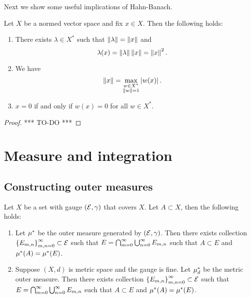 \documentclass[a4paper]{article}
\begin{document}
Next we show some useful implications of Hahn-Banach.

\begin{thm}
Let $X$ be a normed vector space and fix $x \in X$. Then 
the following holds: 
\begin{enumerate}
  \item There exists $\lambda \in X^*$ such that 
  $\left\lVert \lambda\right\rVert = \left\lVert x\right\rVert$ and 
  \[
  \lambda(x) = \left\lVert \lambda\right\rVert \left\lVert x\right\rVert = \left\lVert x\right\rVert^2.
  \]
  \item We have 
  \[
  \left\lVert x\right\rVert = \max_{\substack{w \in X^* \\ \left\lVert w\right\rVert = 1}} 
  \left\lvert w(x)\right\rvert.
  \]
  \item $x = 0$ if and only if $w(x) = 0$ for all $w \in X^*$.
\end{enumerate}
\end{thm}

\begin{proof}

*** TO-DO ***

\end{proof}


\section{Measure and integration}

\subsection{Constructing outer measures}

\begin{lemma}
  Let $X$ be a set with gauge $(\mathcal{E}, \gamma)$ that covers 
  $X$. Let $A \subset X$, then the following holds:
  \begin{enumerate}
    \item Let $\mu^*$ be the outer measure generated 
    by $(\mathcal{E}, \gamma)$. Then there exists collection 
    $\left\{ E_{m,n} \right\}_{m, n= 0}^\infty \subset \mathcal{E}$
    such that $E = \bigcap_{m=0}^\infty \bigcup_{n=0}^\infty E_{m, n}$ such that 
    $A \subset E$ and $\mu^*(A) = \mu^*(E)$. 

    \item Suppose $(X, d)$ is metric space and the gauge is 
    fine.
    Let $\mu^*_d$ be the metric outer measure. Then there exists collection 
    $\left\{ E_{m,n} \right\}_{m, n= 0}^\infty \subset \mathcal{E}$
    such that $E = \bigcap_{m=0}^\infty \bigcup_{n=0}^\infty E_{m, n}$ such that 
    $A \subset E$ and $\mu^*(A) = \mu^*(E)$. 
  \end{enumerate}
\end{lemma}
\end{document}
